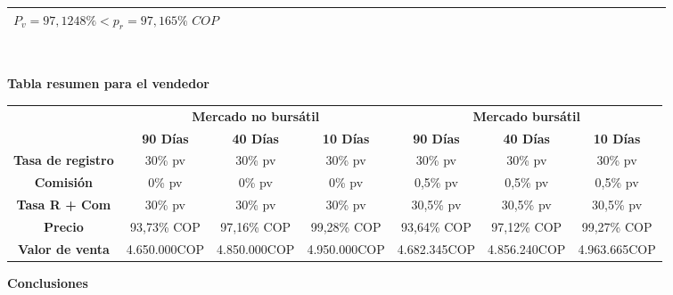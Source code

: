 \begin{center}
\begin{longtable}[H]{|p{0.33\linewidth}|p{0.33\linewidth}|p{0.33\linewidth}|}
{		$P_v = 97,1248\% < p_r = 97,165\% \textit{ COP}$
		\newline
	}                                                                                                  \\ \hline
	
	
\end{longtable}


\end{center}\

\begin{center}
 \textbf{Tabla resumen para el vendedor}
\end{center}

\begin{center}
\renewcommand{\arraystretch}{2} %
\setlength{\tabcolsep}{1pt} %
\begin{tabular}{|c|c|c|c|c|c|c|}
\hline
\rowcolor[HTML]{FFB183}
\multirow{2}{*}{} & \multicolumn{3}{|c|}{\textbf{Mercado no bursátil}}  & \multicolumn{3}{|c|}{\textbf{Mercado bursátil}} \\
\cline{2-7}
\rowcolor[HTML]{FFB183}
& \textbf{90 Días} & \textbf{40 Días} & \textbf{10 Días} & \textbf{90 Días} & \textbf{40 Días} & \textbf{10 Días} \\
\cline{1-7}
\textbf{Tasa de registro} & 30\% pv & 30\% pv & 30\% pv & 30\% pv & 30\% pv & 30\% pv \\
\hline
\textbf{Comisión} & 0\% pv & 0\% pv & 0\% pv & 0,5\% pv & 0,5\% pv & 0,5\% pv \\
\hline
\textbf{Tasa R + Com} & 30\% pv & 30\% pv & 30\% pv & 30,5\% pv & 30,5\% pv & 30,5\% pv \\
\hline
\textbf{Precio} & 93,73\% COP & 97,16\% COP & 99,28\% COP & 93,64\% COP & 97,12\% COP & 99,27\% COP \\
\hline
\textbf{Valor de venta} & 4.650.000COP & 4.850.000COP & 4.950.000COP & 4.682.345COP & 4.856.240COP & 4.963.665COP \\
\hline
\end{tabular}
\end{center}

\begin{center}
  \textbf{Conclusiones}
\end{center}
  
